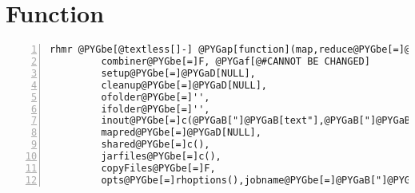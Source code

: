 \documentclass[letterpaper,10pt,english]{manual}
\begin{document}
\section{Function}

\begin{Verbatim}[commandchars=@\[\],numbers=left,firstnumber=1,stepnumber=1]
rhmr @PYGbe[@textless[]-] @PYGap[function](map,reduce@PYGbe[=]@PYGaD[NULL],
         combiner@PYGbe[=]F, @PYGaf[@#CANNOT BE CHANGED]
         setup@PYGbe[=]@PYGaD[NULL],
         cleanup@PYGbe[=]@PYGaD[NULL],
         ofolder@PYGbe[=]'',
         ifolder@PYGbe[=]'',
         inout@PYGbe[=]c(@PYGaB["]@PYGaB[text"],@PYGaB["]@PYGaB[text"]),
         mapred@PYGbe[=]@PYGaD[NULL],
         shared@PYGbe[=]c(),
         jarfiles@PYGbe[=]c(),
         copyFiles@PYGbe[=]F,
         opts@PYGbe[=]rhoptions(),jobname@PYGbe[=]@PYGaB["]@PYGaB["])
\end{Verbatim}
\end{document}
